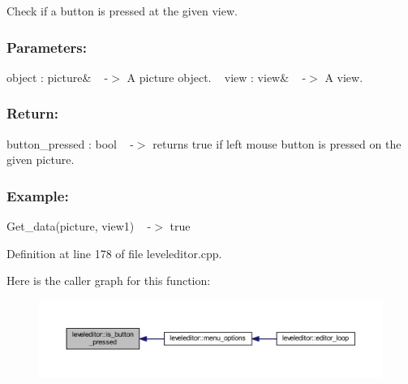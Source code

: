 Check if a button is pressed at the given view. 

\subsubsection*{Parameters\+: }

object \+: \textquotesingle{}picture\& ~\newline
-\/$>$ A picture object. ~\newline
 view \+: view\& ~\newline
-\/$>$ A view. ~\newline
 \subsubsection*{Return\+: }

button\+\_\+pressed \+: bool ~\newline
-\/$>$ returns true if left mouse button is pressed on the given picture. ~\newline
 \subsubsection*{Example\+: }

Get\+\_\+data(picture, view1) ~\newline
-\/$>$ true ~\newline


Definition at line 178 of file leveleditor.\+cpp.

Here is the caller graph for this function\+:
\nopagebreak
\begin{figure}[H]
\begin{center}
\leavevmode
\includegraphics[width=350pt]{classleveleditor_aaa46d78a5b4630364b7b8f115b23dcff_icgraph}
\end{center}
\end{figure}
\mbox{\label{classleveleditor_a0c983ad2887a677d22fbea4eed0ec7d4}} 

